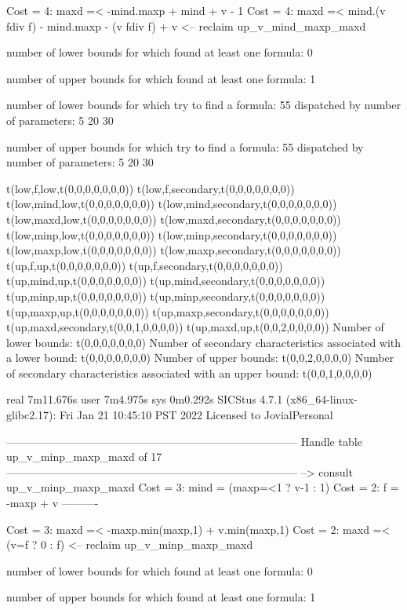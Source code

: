 Cost =  4:  maxd =< -mind.maxp + mind + v - 1
Cost =  4:  maxd =< mind.(v fdiv f) - mind.maxp - (v fdiv f) + v
<-- reclaim up_v_mind_maxp_maxd

number of lower bounds for which found at least one formula: 0

number of upper bounds for which found at least one formula: 1

number of lower bounds for which try to find a formula: 55
dispatched by number of parameters: 5  20  30

number of upper bounds for which try to find a formula: 55
dispatched by number of parameters: 5  20  30

t(low,f,low,t(0,0,0,0,0,0,0))
t(low,f,secondary,t(0,0,0,0,0,0,0))
t(low,mind,low,t(0,0,0,0,0,0,0))
t(low,mind,secondary,t(0,0,0,0,0,0,0))
t(low,maxd,low,t(0,0,0,0,0,0,0))
t(low,maxd,secondary,t(0,0,0,0,0,0,0))
t(low,minp,low,t(0,0,0,0,0,0,0))
t(low,minp,secondary,t(0,0,0,0,0,0,0))
t(low,maxp,low,t(0,0,0,0,0,0,0))
t(low,maxp,secondary,t(0,0,0,0,0,0,0))
t(up,f,up,t(0,0,0,0,0,0,0))
t(up,f,secondary,t(0,0,0,0,0,0,0))
t(up,mind,up,t(0,0,0,0,0,0,0))
t(up,mind,secondary,t(0,0,0,0,0,0,0))
t(up,minp,up,t(0,0,0,0,0,0,0))
t(up,minp,secondary,t(0,0,0,0,0,0,0))
t(up,maxp,up,t(0,0,0,0,0,0,0))
t(up,maxp,secondary,t(0,0,0,0,0,0,0))
t(up,maxd,secondary,t(0,0,1,0,0,0,0))
t(up,maxd,up,t(0,0,2,0,0,0,0))
Number of lower bounds:                                             t(0,0,0,0,0,0,0)
Number of secondary characteristics associated with a lower bound:  t(0,0,0,0,0,0,0)
Number of upper bounds:                                             t(0,0,2,0,0,0,0)
Number of secondary characteristics associated with an upper bound: t(0,0,1,0,0,0,0)

real	7m11.676s
user	7m4.975s
sys	0m0.292s
SICStus 4.7.1 (x86_64-linux-glibc2.17): Fri Jan 21 10:45:10 PST 2022
Licensed to JovialPersonal


--------------------------------------------------------------------------------
Handle table up_v_minp_maxp_maxd of 17
--------------------------------------------------------------------------------
--> consult up_v_minp_maxp_maxd
Cost =  3:  mind = (maxp=<1 ? v-1 : 1)
Cost =  2:  f    = -maxp + v
----------

Cost =  3:  maxd =< -maxp.min(maxp,1) + v.min(maxp,1)
Cost =  2:  maxd =< (v=f ? 0 : f)
<-- reclaim up_v_minp_maxp_maxd

number of lower bounds for which found at least one formula: 0

number of upper bounds for which found at least one formula: 1

